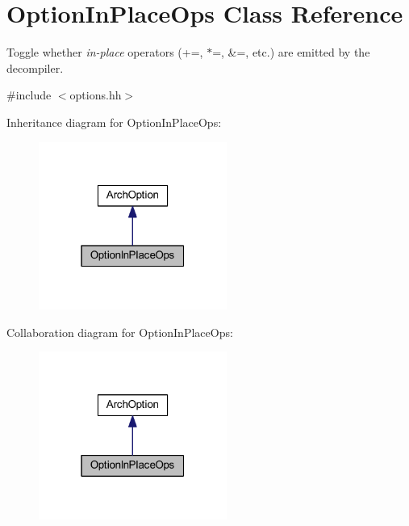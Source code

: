 \hypertarget{class_option_in_place_ops}{}\section{Option\+In\+Place\+Ops Class Reference}
\label{class_option_in_place_ops}


Toggle whether {\itshape in-\/place} operators (+=, $\ast$=, \&=, etc.) are emitted by the decompiler.  




{\ttfamily \#include $<$options.\+hh$>$}



Inheritance diagram for Option\+In\+Place\+Ops\+:
\nopagebreak
\begin{figure}[H]
\begin{center}
\leavevmode
\includegraphics[width=175pt]{class_option_in_place_ops__inherit__graph}
\end{center}
\end{figure}


Collaboration diagram for Option\+In\+Place\+Ops\+:
\nopagebreak
\begin{figure}[H]
\begin{center}
\leavevmode
\includegraphics[width=175pt]{class_option_in_place_ops__coll__graph}
\end{center}
\end{figure}
